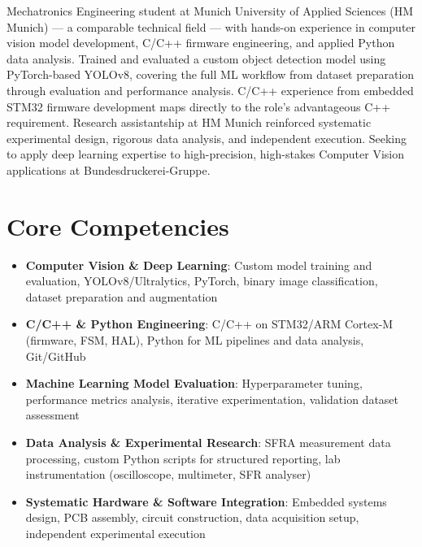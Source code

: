 \documentclass[11pt,a4paper,sans]{moderncv}
\begin{document}
\makecvtitle


\vspace{6pt}
\small{Mechatronics Engineering student at Munich University of Applied Sciences (HM Munich) --- a comparable technical field --- with hands-on experience in computer vision model development, C/C++ firmware engineering, and applied Python data analysis. Trained and evaluated a custom object detection model using PyTorch-based YOLOv8, covering the full ML workflow from dataset preparation through evaluation and performance analysis. C/C++ experience from embedded STM32 firmware development maps directly to the role's advantageous C++ requirement. Research assistantship at HM Munich reinforced systematic experimental design, rigorous data analysis, and independent execution. Seeking to apply deep learning expertise to high-precision, high-stakes Computer Vision applications at Bundesdruckerei-Gruppe.}


\section{Core Competencies}
\vspace{1pt}
\begin{itemize}

\item \textbf{Computer Vision \& Deep Learning}: Custom model training and evaluation, YOLOv8/Ultralytics, PyTorch, binary image classification, dataset preparation and augmentation

\item \textbf{C/C++ \& Python Engineering}: C/C++ on STM32/ARM Cortex-M (firmware, FSM, HAL), Python for ML pipelines and data analysis, Git/GitHub

\item \textbf{Machine Learning Model Evaluation}: Hyperparameter tuning, performance metrics analysis, iterative experimentation, validation dataset assessment

\item \textbf{Data Analysis \& Experimental Research}: SFRA measurement data processing, custom Python scripts for structured reporting, lab instrumentation (oscilloscope, multimeter, SFR analyser)

\item \textbf{Systematic Hardware \& Software Integration}: Embedded systems design, PCB assembly, circuit construction, data acquisition setup, independent experimental execution

\end{itemize}
\end{document}
